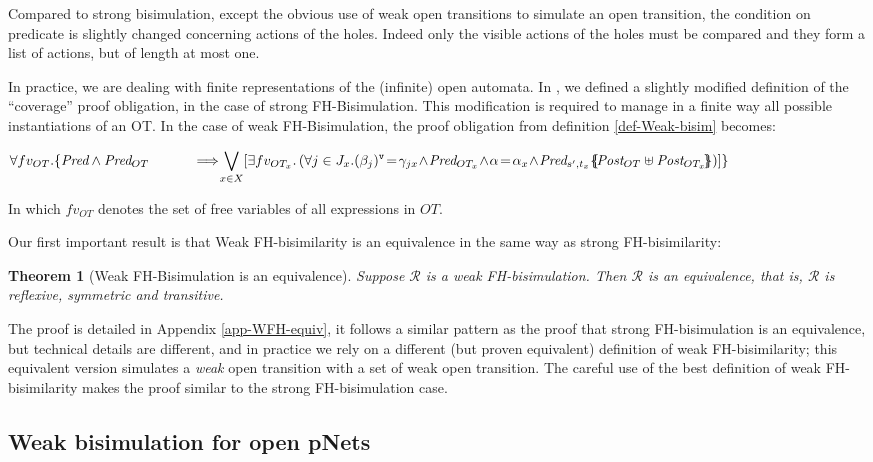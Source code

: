 \documentclass{lmcs}
\newtheorem{theorem}{Theorem}
\begin{document}
Compared to strong bisimulation, except the obvious use of weak open transitions to simulate an open transition, the condition on predicate is slightly changed concerning actions of the holes. Indeed only the visible actions of the holes must be compared and they form a list of actions, but of length at most one.

In practice, we are dealing with finite representations of the (infinite) open automata. In \cite{PEPM}, we defined a slightly modified definition of the ``coverage'' proof obligation, in the case of strong FH-Bisimulation. This modification is required to manage in a finite way all possible instantiations of an OT. In the case of weak FH-Bisimulation, the proof obligation from definition \ref{def-Weak-bisim} becomes:
      
 $\forall fv_{OT}. \{ \Pred \land \Pred_{OT}\\
\hspace{1cm} \implies\!\!\! \displaystyle{\bigvee_{x\in X}\!
  \left[\exists fv_{OT_x}.\\
    \left( \forall j\in J_x. \vis{\beta_j}\!=\!\gamma_{jx}\! \land\! \Pred_{OT_x}
     \!\land\! \alpha\!=\!\alpha_x\! \land\!  
     \Pred_{s',t_x}\subst{\Post_{OT}\uplus\Post_{OT_x}}\right)\right]\}}$

In which $fv_{OT}$ denotes the set of free variables of all expressions in $OT$.

\medskip
Our first important result is that Weak FH-bisimilarity is an equivalence in the same way as strong FH-bisimilarity:


\begin{theorem}[Weak FH-Bisimulation is an equivalence]\label{thm-weak-equiv} Suppose $\mathcal{R}$ 
is a weak FH-bisimulation. Then $\mathcal{R}$ is an equivalence, that is, $\mathcal{R}$ is 
reflexive, symmetric and transitive.
\end{theorem}
The proof  is detailed in Appendix \ref{app-WFH-equiv}, it follows a similar pattern as the proof that strong FH-bisimulation is an equivalence, but technical details are different, and in practice we rely on a different (but proven equivalent) definition of weak FH-bisimilarity; this equivalent version simulates a \emph{weak} open transition with a set of weak open transition. The careful use of the best definition of weak FH-bisimilarity makes the proof similar to the strong FH-bisimulation case.



\subsection{Weak bisimulation for open pNets}
\end{document}
